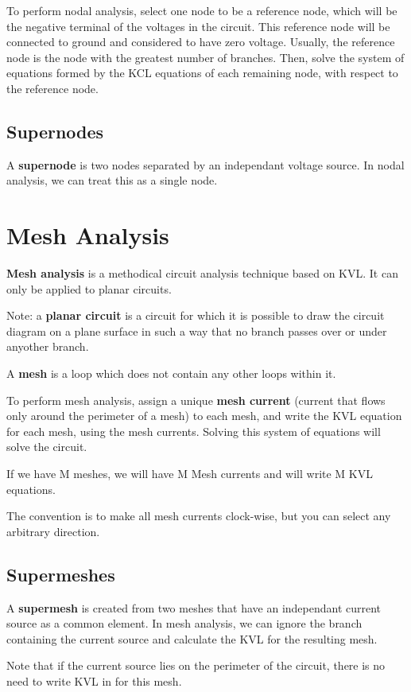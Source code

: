 \documentclass[12pt]{article}
\begin{document}
To perform nodal analysis, select one node to be a reference node, which will be the negative terminal of the voltages in the circuit. This reference node will be connected to ground and considered to have zero voltage. Usually, the reference node is the node with the greatest number of branches. Then, solve the system of equations formed by the KCL equations of each remaining node, with respect to the reference node.

\subsection*{Supernodes}
A {\bf supernode} is two nodes separated by an independant voltage source. In nodal analysis, we can treat this as a single node.

\section*{Mesh Analysis}
{\bf Mesh analysis} is a methodical circuit analysis technique based on KVL. It can only be applied to planar circuits.

Note: a {\bf planar circuit} is a circuit for which it is possible to draw the circuit diagram on a plane surface in such a way that no branch passes over or under anyother branch.

A {\bf mesh} is a loop which does not contain any other loops within it.

To perform mesh analysis, assign a unique {\bf mesh current} (current that flows only around the perimeter of a mesh) to each mesh, and write the KVL equation for each mesh, using the mesh currents. Solving this system of equations will solve the circuit.

If we have M meshes, we will have M Mesh currents and will write M KVL equations.

The convention is to make all mesh currents clock-wise, but you can select any arbitrary direction.

\subsection*{Supermeshes}
A {\bf supermesh} is created from two meshes that have an independant current source as a common element. In mesh analysis, we can ignore the branch containing the current source and calculate the KVL for the resulting mesh.

Note that if the current source lies on the perimeter of the circuit, there is no need to write KVL in for this mesh.
\end{document}
